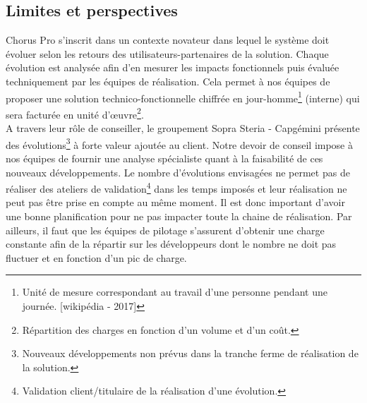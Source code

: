 \documentclass[12pt,a4paper]{article}
\begin{document}
\subsection{Limites et perspectives}
Chorus Pro s'inscrit dans un contexte novateur dans lequel le système doit évoluer selon les retours des utilisateurs-partenaires de la solution. Chaque évolution est analysée afin d'en mesurer les impacts fonctionnels puis évaluée techniquement par les équipes de réalisation. Cela permet à nos équipes de proposer une solution technico-fonctionnelle chiffrée en jour-homme\footnote{Unité de mesure correspondant au travail d’une personne pendant une journée. [wikipédia - 2017]} (interne) qui sera facturée en unité d'œuvre\footnote{Répartition des charges en fonction d'un volume et d'un coût.}.\\
A travers leur rôle de conseiller, le groupement Sopra Steria - Capgémini présente des évolutions\footnote{Nouveaux développements non prévus dans la tranche ferme de réalisation de la solution.} à forte valeur ajoutée au client. Notre devoir de conseil impose à nos équipes de fournir une analyse spécialiste quant à la faisabilité de ces nouveaux développements. Le nombre d'évolutions envisagées ne permet pas de réaliser des ateliers de validation\footnote{Validation client/titulaire de la réalisation d'une évolution.} dans les temps imposés et leur réalisation ne peut pas être prise en compte au même moment. Il est donc important d'avoir une bonne planification pour ne pas impacter toute la chaine de réalisation. Par ailleurs, il faut que les équipes de pilotage s'assurent d'obtenir une charge constante afin de la répartir sur les développeurs dont le nombre ne doit pas fluctuer et en fonction d'un pic de charge.\\ 
\clearpage
\newpage
\end{document}

